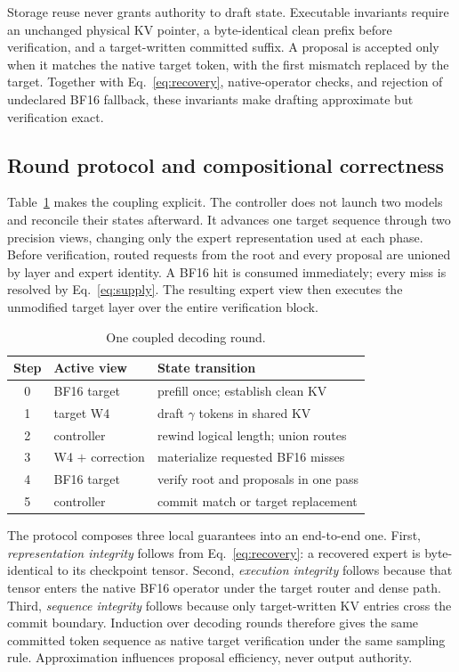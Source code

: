 Storage reuse never grants authority to draft state. Executable invariants require an
unchanged physical KV pointer, a byte-identical clean prefix before verification, and
a target-written committed suffix. A proposal is accepted only when it matches the
native target token, with the first mismatch replaced by the target. Together with
Eq.~\eqref{eq:recovery}, native-operator checks, and rejection of undeclared BF16
fallback, these invariants make drafting approximate but verification exact.

\subsection{Round protocol and compositional correctness}

Table~\ref{tab:round-protocol} makes the coupling explicit. The controller does not
launch two models and reconcile their states afterward. It advances one target
sequence through two precision views, changing only the expert representation used
at each phase. Before verification, routed requests from the root and every proposal
are unioned by layer and expert identity. A BF16 hit is consumed immediately; every
miss is resolved by Eq.~\eqref{eq:supply}. The resulting expert view then executes
the unmodified target layer over the entire verification block.

\begin{table}[t]
  \centering
  \caption{One coupled decoding round.}
  \label{tab:round-protocol}
  \footnotesize
  \begin{tabular*}{\columnwidth}{@{\extracolsep{\fill}}cll@{}}
    \toprule
    Step & Active view & State transition \\
    \midrule
    0 & BF16 target & prefill once; establish clean KV \\
    1 & target W4 & draft $\gamma$ tokens in shared KV \\
    2 & controller & rewind logical length; union routes \\
    3 & W4 $+$ correction & materialize requested BF16 misses \\
    4 & BF16 target & verify root and proposals in one pass \\
    5 & controller & commit match or target replacement \\
    \bottomrule
  \end{tabular*}
\end{table}

The protocol composes three local guarantees into an end-to-end one. First,
\emph{representation integrity} follows from Eq.~\eqref{eq:recovery}: a recovered
expert is byte-identical to its checkpoint tensor. Second, \emph{execution integrity}
follows because that tensor enters the native BF16 operator under the target router
and dense path. Third, \emph{sequence integrity} follows because only target-written
KV entries cross the commit boundary. Induction over decoding rounds therefore gives
the same committed token sequence as native target verification under the same
sampling rule. Approximation influences proposal efficiency, never output authority.

